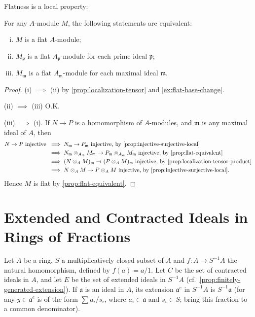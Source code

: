 Flatness is a local property:

\begin{proposition}\label{prop:flat-local}
For any $A$-module $M$, the following statements are equivalent:
\begin{enumerate}[i)]
    \item $M$ is a flat $A$-module;
    \item $M_{\mathfrak{p}}$ is a flat $A_{\mathfrak{p}}$-module for each prime ideal $\mathfrak{p}$;
    \item $M_{\mathfrak{m}}$ is a flat $A_{\mathfrak{m}}$-module for each maximal ideal $\mathfrak{m}$.
\end{enumerate}
\end{proposition}

\begin{proof}
(i) $\implies$ (ii) by \eqref{prop:localization-tensor} and \eqref{ex:flat-base-change}.

(ii) $\implies$ (iii) O.K.

(iii) $\implies$ (i). If $N \to P$ is a homomorphism of $A$-modules, and $\mathfrak{m}$ is any maximal ideal of $A$, then
\begin{align*}
    N \to P \text{ injective } &\implies N_{\mathfrak{m}} \to P_{\mathfrak{m}} \text{ injective, by \eqref{prop:injective-surjective-local}} \\
    &\implies N_{\mathfrak{m}} \otimes_{A_{\mathfrak{m}}} M_{\mathfrak{m}} \to P_{\mathfrak{m}} \otimes_{A_{\mathfrak{m}}} M_{\mathfrak{m}} \text{ injective, by \eqref{prop:flat-equivalent}} \\
    &\implies (N \otimes_A M)_{\mathfrak{m}} \to (P \otimes_A M)_{\mathfrak{m}} \text{ injective, by \eqref{prop:localization-tensor-product}} \\
    &\implies N \otimes_A M \to P \otimes_A M \text{ injective, by \eqref{prop:injective-surjective-local}.}
\end{align*}
Hence $M$ is flat by \eqref{prop:flat-equivalent}.
\end{proof}

\section*{Extended and Contracted Ideals in Rings of Fractions}

Let $A$ be a ring, $S$ a multiplicatively closed subset of $A$ and $f \colon A \to S^{-1}A$ the natural homomorphism, defined by $f(a) = a/1$. Let $C$ be the set of contracted ideals in $A$, and let $E$ be the set of extended ideals in $S^{-1}A$ (cf.\ \eqref{prop:finitely-generated-extension}). If $\mathfrak{a}$ is an ideal in $A$, its extension $\mathfrak{a}^e$ in $S^{-1}A$ is $S^{-1}\mathfrak{a}$ (for any $y \in \mathfrak{a}^e$ is of the form $\sum a_i/s_i$, where $a_i \in \mathfrak{a}$ and $s_i \in S$; bring this fraction to a common denominator).

